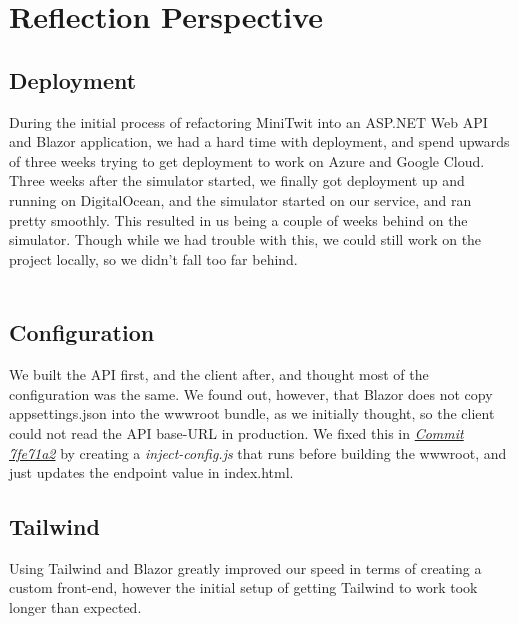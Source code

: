 \section{Reflection Perspective}
\begin{comment}
Describe the biggest issues, how you solved them, and which are major lessons learned with regards to:

    evolution and refactoring
    operation, and
    maintenance

of your ITU-MiniTwit systems. Link back to respective commit messages, issues, tickets, etc. to illustrate these.

Also reflect and describe what was the "DevOps" style of your work. For example, what did you do differently to previous development projects and how did it work?
\end{comment}
\subsection{Deployment}
During the initial process of refactoring MiniTwit into an ASP.NET Web API and Blazor application, we had a hard time with deployment, and spend upwards of three weeks trying to get deployment to work on Azure and Google Cloud. Three weeks after the simulator started, we finally got deployment up and running on DigitalOcean, and the simulator started on our service, and ran pretty smoothly. This resulted in us being a couple of weeks behind on the simulator. Though while we had trouble with this, we could still work on the project locally, so we didn't fall too far behind.
\\\\
\subsection{Configuration}
We built the API first, and the client after, and thought most of the configuration was the same. We found out, however, that Blazor does not copy appsettings.json into the wwwroot bundle, as we initially thought, so the client could not read the API base-URL in production. We fixed this in \textit{\href{https://github.com/Lukski175/MiniTwit-FS/commit/7fe71a2a26f6f5cb42b925a59eede102ae1238f5}{Commit 7fe71a2}} by creating a \textit{inject-config.js} that runs before building the wwwroot, and just updates the endpoint value in index.html.
\\
\subsection{Tailwind}
Using Tailwind and Blazor greatly improved our speed in terms of creating a custom front-end, however the initial setup of getting Tailwind to work took longer than expected.
\\\\
